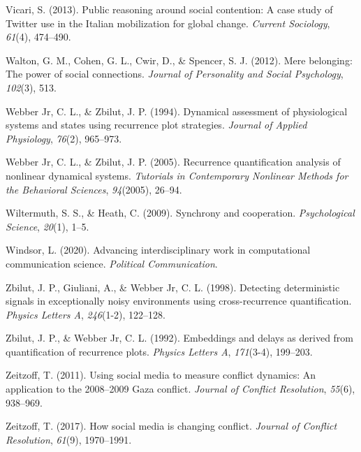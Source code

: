 \documentclass[
  english,
  man]{apa6}
\begin{document}
\leavevmode\hypertarget{ref-vicari2013public}{}%
Vicari, S. (2013). Public reasoning around social contention: A case study of Twitter use in the Italian mobilization for global change. \emph{Current Sociology}, \emph{61}(4), 474--490.

\leavevmode\hypertarget{ref-walton2012mere}{}%
Walton, G. M., Cohen, G. L., Cwir, D., \& Spencer, S. J. (2012). Mere belonging: The power of social connections. \emph{Journal of Personality and Social Psychology}, \emph{102}(3), 513.

\leavevmode\hypertarget{ref-webber1994dynamical}{}%
Webber Jr, C. L., \& Zbilut, J. P. (1994). Dynamical assessment of physiological systems and states using recurrence plot strategies. \emph{Journal of Applied Physiology}, \emph{76}(2), 965--973.

\leavevmode\hypertarget{ref-webber2005recurrence}{}%
Webber Jr, C. L., \& Zbilut, J. P. (2005). Recurrence quantification analysis of nonlinear dynamical systems. \emph{Tutorials in Contemporary Nonlinear Methods for the Behavioral Sciences}, \emph{94}(2005), 26--94.

\leavevmode\hypertarget{ref-wiltermuth2009synchrony}{}%
Wiltermuth, S. S., \& Heath, C. (2009). Synchrony and cooperation. \emph{Psychological Science}, \emph{20}(1), 1--5.

\leavevmode\hypertarget{ref-Windsor2020}{}%
Windsor, L. (2020). Advancing interdisciplinary work in computational communication science. \emph{Political Communication}.

\leavevmode\hypertarget{ref-zbilut1998detecting}{}%
Zbilut, J. P., Giuliani, A., \& Webber Jr, C. L. (1998). Detecting deterministic signals in exceptionally noisy environments using cross-recurrence quantification. \emph{Physics Letters A}, \emph{246}(1-2), 122--128.

\leavevmode\hypertarget{ref-zbilut1992embeddings}{}%
Zbilut, J. P., \& Webber Jr, C. L. (1992). Embeddings and delays as derived from quantification of recurrence plots. \emph{Physics Letters A}, \emph{171}(3-4), 199--203.

\leavevmode\hypertarget{ref-zeitzoff2011using}{}%
Zeitzoff, T. (2011). Using social media to measure conflict dynamics: An application to the 2008--2009 Gaza conflict. \emph{Journal of Conflict Resolution}, \emph{55}(6), 938--969.

\leavevmode\hypertarget{ref-zeitzoff2017social}{}%
Zeitzoff, T. (2017). How social media is changing conflict. \emph{Journal of Conflict Resolution}, \emph{61}(9), 1970--1991.

\endgroup
\end{document}
